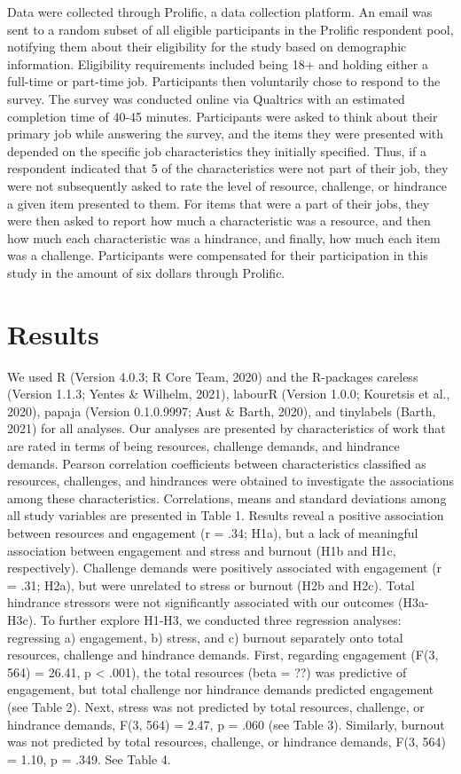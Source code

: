 \documentclass[
  man]{apa6}
\begin{document}
Data were collected through Prolific, a data collection platform. An email was sent to a random subset of all eligible participants in the Prolific respondent pool, notifying them about their eligibility for the study based on demographic information. Eligibility requirements included being 18+ and holding either a full-time or part-time job. Participants then voluntarily chose to respond to the survey. The survey was conducted online via Qualtrics with an estimated completion time of 40-45 minutes. Participants were asked to think about their primary job while answering the survey, and the items they were presented with depended on the specific job characteristics they initially specified. Thus, if a respondent indicated that 5 of the characteristics were not part of their job, they were not subsequently asked to rate the level of resource, challenge, or hindrance a given item presented to them. For items that were a part of their jobs, they were then asked to report how much a characteristic was a resource, and then how much each characteristic was a hindrance, and finally, how much each item was a challenge. Participants were compensated for their participation in this study in the amount of six dollars through Prolific.

\hypertarget{results}{%
\section{Results}\label{results}}

We used R (Version 4.0.3; R Core Team, 2020) and the R-packages careless (Version 1.1.3; Yentes \& Wilhelm, 2021), labourR (Version 1.0.0; Kouretsis et al., 2020), papaja (Version 0.1.0.9997; Aust \& Barth, 2020), and tinylabels (Barth, 2021) for all analyses. Our analyses are presented by characteristics of work that are rated in terms of being resources, challenge demands, and hindrance demands. Pearson correlation coefficients between characteristics classified as resources, challenges, and hindrances were obtained to investigate the associations among these characteristics.
Correlations, means and standard deviations among all study variables are presented in Table 1. Results reveal a positive association between resources and engagement (r = .34; H1a), but a lack of meaningful association between engagement and stress and burnout (H1b and H1c, respectively). Challenge demands were positively associated with engagement (r = .31; H2a), but were unrelated to stress or burnout (H2b and H2c). Total hindrance stressors were not significantly associated with our outcomes (H3a-H3c). To further explore H1-H3, we conducted three regression analyses: regressing a) engagement, b) stress, and c) burnout separately onto total resources, challenge and hindrance demands. First, regarding engagement (F(3, 564) = 26.41, p \textless{} .001), the total resources (beta = ??) was predictive of engagement, but total challenge nor hindrance demands predicted engagement (see Table 2). Next, stress was not predicted by total resources, challenge, or hindrance demands, F(3, 564) = 2.47, p = .060 (see Table 3). Similarly, burnout was not predicted by total resources, challenge, or hindrance demands, F(3, 564) = 1.10, p = .349. See Table 4.
\end{document}
